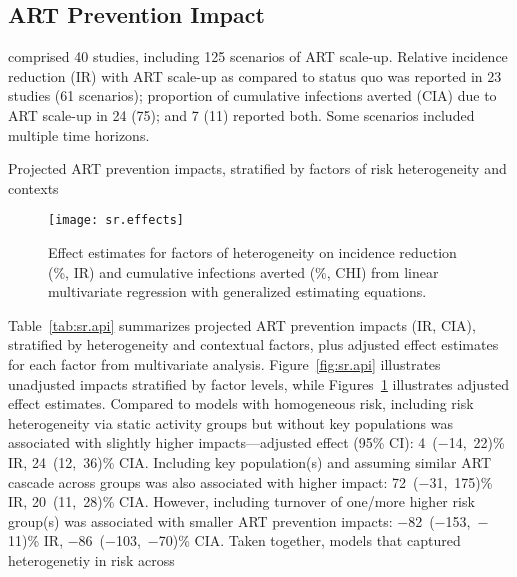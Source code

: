 \subsection{ART Prevention Impact}\label{sr.res.api}
 comprised 40 studies, including 125 scenarios of ART scale-up.
Relative incidence reduction (IR) with ART scale-up as compared to status quo
was reported in 23 studies (61 scenarios);
proportion of cumulative infections averted (CIA) due to ART scale-up
in 24 (75); and 7 (11) reported both.
Some scenarios included multiple time horizons.
\begin{table}
  \centering
  \caption{Projected ART prevention impacts,
    stratified by factors of risk heterogeneity and contexts}
  \label{tab:sr.api}
  
\end{table}
\begin{figure}[h]
  \centering
  \texttt{[image: sr.effects]}
  \caption{Effect estimates for factors of heterogeneity on
    incidence reduction (\%, IR) and cumulative infections averted (\%, CHI)
    from linear multivariate regression with generalized estimating equations.}
  \label{fig:sr.effects}
\end{figure}
Table~\ref{tab:sr.api} summarizes projected ART prevention impacts (IR, CIA),
stratified by heterogeneity and contextual factors,
plus adjusted effect estimates for each factor from multivariate analysis.
Figure~\ref{fig:sr.api} illustrates
unadjusted impacts stratified by factor levels, while
Figures~\ref{fig:sr.effects} illustrates adjusted effect estimates.
Compared to models with homogeneous risk,
including risk heterogeneity via static activity groups but without key populations
was associated with slightly higher impacts---adjusted effect (95\% CI):
4~($-$14,~22)\% IR, 24~(12,~36)\% CIA.
Including key population(s) and assuming similar ART cascade across groups
was also associated with higher impact:
72~($-$31,~175)\% IR, 20~(11,~28)\% CIA.
However, including turnover of one/more higher risk group(s)
was associated with smaller ART prevention impacts:
$-$82~($-$153,~$-$11)\% IR, $-$86~($-$103,~$-$70)\% CIA.
Taken together, models that captured heterogenetiy in risk across
